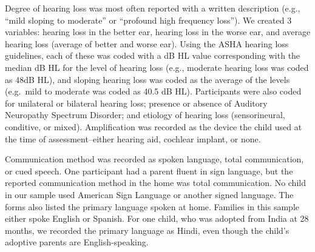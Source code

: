 \documentclass[english,man]{apa6}
\begin{document}
Degree of hearing loss was most often reported with a written description (e.g., \enquote{mild sloping to moderate} or \enquote{profound high frequency loss}). We created 3 variables: hearing loss in the better ear, hearing loss in the worse ear, and average hearing loss (average of better and worse ear). Using the ASHA hearing loss guidelines, each of these was coded with a dB HL value corresponding with the median dB HL for the level of hearing loss (e.g., moderate hearing loss was coded as 48dB HL), and sloping hearing loss was coded as the average of the levels (e.g.~mild to moderate was coded as 40.5 dB HL). Participants were also coded for unilateral or bilateral hearing loss; presence or absence of Auditory Neuropathy Spectrum Disorder; and etiology of hearing loss (sensorineural, conditive, or mixed). Amplification was recorded as the device the child used at the time of assessment--either hearing aid, cochlear implant, or none.

\begin{table}[!h]

\caption{\label{tab:amp-info}Audiological Characteristics of the Sample}
\centering
{}
\end{table}

Communication method was recorded as spoken language, total communication, or cued speech. One participant had a parent fluent in sign language, but the reported communication method in the home was total communication. No child in our sample used American Sign Language or another signed language. The forms also listed the primary language spoken at home. Families in this sample either spoke English or Spanish. For one child, who was adopted from India at 28 months, we recorded the primary language as Hindi, even though the child's adoptive parents are English-speaking.
\end{document}
